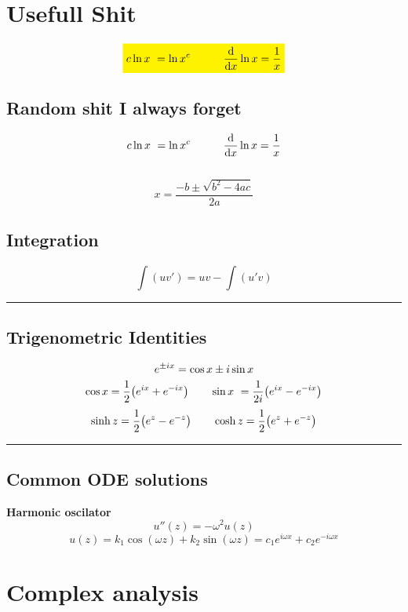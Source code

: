 \documentclass[10pt,a4paper]{article}
\renewcommand{\exp}{e^}
\newcommand{\holine}{\rule{286pt}{1pt}}
\newcommand{\half}{\frac{1}{2}}
\newcommand{\yl}[1]{\colorbox{yellow}{$\displaystyle #1$}}
\begin{document}
\begin{multicols}{2}


\section*{Usefull Shit}

\begin{equation*}
    \yl{
        c \ln{x} = \ln{x^c} \quad\quad\quad \dv{x}\ln{x} = \frac{1}{x}
    }
\end{equation*}


\subsection*{Random shit I always forget}
\[
    c \ln{x} = \ln{x^c} \quad\quad\quad \dv{x}\ln{x} = \frac{1}{x}
\]
\\
\[
    x = \frac{-b\pm \sqrt{b^2 - 4ac}}{2a}
\]
\subsection*{Integration}
\[
    \int (uv') = uv - \int(u'v)
\]


\holine
\subsection*{Trigenometric Identities}
\[
    \exp{\pm i x} = \cos{x} \pm i\sin{x} \\
\]
\[
    \cos{x} = \half \qty(\exp{ix} + \exp{-ix}) \quad\quad
    \sin{x} = \frac{1}{2i}\qty(\exp{ix} - \exp{-ix})
\]
\[
    \sinh{z} = \half\qty(\exp{z}-\exp{-z}) \quad\quad \cosh{z} = \half\qty(\exp{z}+\exp{-z})
\]

\holine
\subsection*{Common ODE solutions}
\textbf{Harmonic oscilator}
\[
    u''(z) = -\omega^2 u(z)
\]
\[
    u(z) = k_1 \cos(\omega z) + k_2\sin(\omega z) = c_1 \exp{i\omega x} + c_2 \exp{-i\omega x}
\]




\newpage
\section*{Complex analysis}

\end{multicols}
\end{document}
